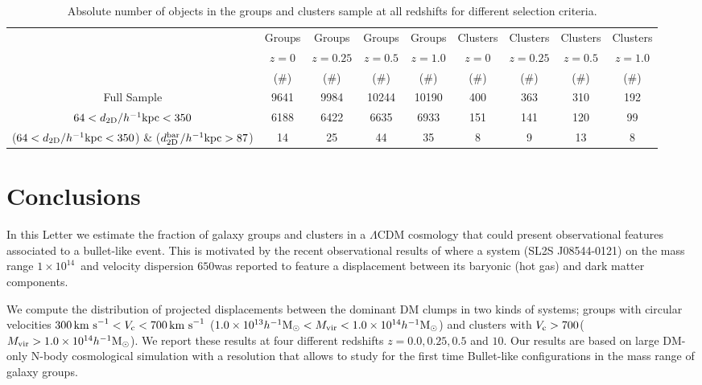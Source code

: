 \documentclass{emulateapj}
\newcommand{\hkpc}{{\ifmmode{h^{-1}{\rm kpc}}\else{$h^{-1}$kpc }\fi}}
\newcommand{\hMsun}{{\ifmmode{h^{-1}{\rm {M_{\odot}}}}\else{$h^{-1}{\rm{M_{\odot}}}$}\fi}}
\newcommand{\kms}{{\ifmmode{{\mathrm{\,km\ s}^{-1}}}\else{\,km~s$^{-1}$}\fi}}
\newcommand{\bullg}{SL2S J08544-0121}
\begin{document}
  
\begin{table}
\begin{center}
\begin{tabular}{ccccccccc}\hline\hline
        & Groups & Groups & Groups & Groups & Clusters & Clusters & Clusters & Clusters\\
  & $z=0$   & $z=0.25$   & $z=0.5$   & $z=1.0$   & $z=0$   & $z=0.25$   & $z=0.5$   & $z=1.0$ \\
  & ($\# $)    & ($\# $)    & ($\# $)    & ($\# $)    & ($\# $)    & ($\# $)    & ($\# $)    & ($\# $)  \\\hline
Full Sample & 9641 & 9984 & 10244 & 10190 & 400  & 363 & 310 & 192 \\
$64 <d_{\rm 2D}/\hkpc< 350$ & 6188 & 6422 & 6635 & 6933 & 151 &
141 & 120 & 99\\
($64 <d_{\rm 2D}/\hkpc< 350 $) \& ($d_{\rm 2D}^{\rm bar}/\hkpc >87$) & 14 & 25 & 44 & 35 & 8 & 9 & 13 & 8 \\\hline\hline
\end{tabular}
\caption{Absolute number of objects in the groups and clusters sample
  at all redshifts for different selection criteria. }
\label{table:numbers}
\end{center}
\end{table}





\section{Conclusions}
\label{sec:conclusions}

In this Letter we estimate the fraction of galaxy groups and clusters
in a $\Lambda$CDM cosmology that could present observational features
associated to a bullet-like event. This is motivated by the recent
observational results of \citep{Gastaldello} where a system (\bullg)
on the mass range $1\times 10^{14}$\hMsun\ and velocity dispersion
$650$\kms was reported to feature a displacement between its baryonic
(hot gas) and dark matter components. 

We compute the distribution of projected displacements
between the dominant DM clumps in two kinds of systems; groups with
circular velocities $300\kms<V_{\rm c}<700\kms$ ($1.0\times
10^{13}\hMsun < M_{\rm vir}<1.0\times 10^{14}\hMsun$) and clusters with $V_{\rm
  c}>700$\kms ($M_{\rm vir}>1.0\times 10^{14}\hMsun$). We report these
results at four different redshifts $z=0.0,0.25,0.5$ and $10$. Our
results are based on large DM-only N-body cosmological simulation with
a resolution that allows to study for the first time Bullet-like
configurations in the mass range of galaxy groups. 
\end{document}
